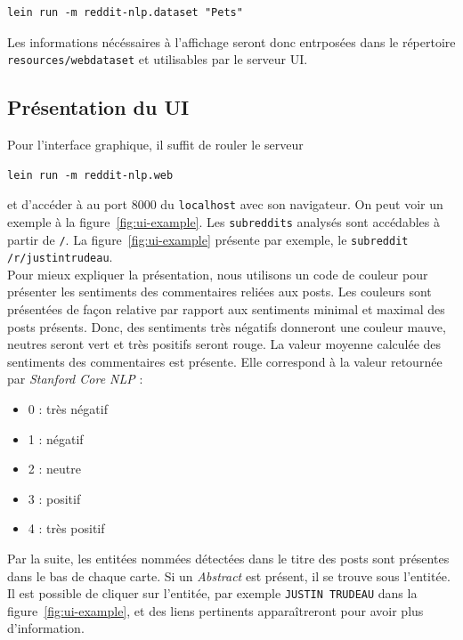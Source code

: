\documentclass[12pt]{article}
\begin{document}
\begin{verbatim}
lein run -m reddit-nlp.dataset "Pets"
\end{verbatim}

Les informations nécéssaires à l'affichage seront donc entrposées dans le répertoire \verb;resources/webdataset; et utilisables par le serveur UI.

\subsection{Présentation du UI}

Pour l'interface graphique, il suffit de rouler le serveur 

\begin{verbatim}
lein run -m reddit-nlp.web
\end{verbatim}

et d'accéder à au port 8000 du \verb;localhost; avec son navigateur. On peut voir un exemple à la figure~\ref{fig:ui-example}. Les \verb;subreddits; analysés sont accédables à partir de \verb;/;. La figure~\ref{fig:ui-example} présente par exemple, le \verb;subreddit; \verb;/r/justintrudeau;.\\

Pour mieux expliquer la présentation, nous utilisons un code de couleur pour présenter les sentiments des commentaires reliées aux posts. Les couleurs sont présentées de façon relative par rapport aux sentiments minimal et maximal des posts présents. Donc, des sentiments très négatifs donneront une couleur mauve, neutres seront vert et très positifs seront rouge. La valeur moyenne calculée des sentiments des commentaires est présente. Elle correspond à la valeur retournée par \textit{Stanford Core NLP} :

\begin{itemize}
\item 0 : très négatif
\item 1 : négatif
\item 2 : neutre
\item 3 : positif
\item 4 : très positif
\\
\end{itemize}

Par la suite, les entitées nommées détectées dans le titre des posts sont présentes dans le bas de chaque carte. Si un \textit{Abstract} est présent, il se trouve sous l'entitée. Il est possible de cliquer sur l'entitée, par exemple \verb;JUSTIN TRUDEAU; dans la figure~\ref{fig:ui-example}, et des liens pertinents apparaîtreront pour avoir plus d'information.
\end{document}
